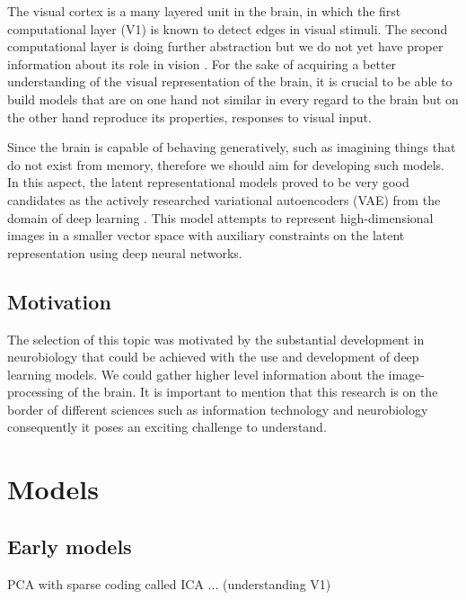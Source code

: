 \documentclass[11pt, english]{article}
\begin{document}
\par  The visual cortex is a many layered unit in the brain, in which the first computational layer (V1) is known to detect edges in visual stimuli.
The second computational layer is doing further abstraction but we do not yet
have proper information about its role in vision \cite{ZiembaV2}. For the sake of acquiring a
better understanding of the visual representation of the brain, it is crucial to be able to build models that are on one hand not similar in every regard to the brain but on the other hand reproduce its properties, responses to visual input.

\vspace{3mm}

\par Since the brain is capable of behaving generatively, such as imagining things that do not exist from memory, therefore we should aim for developing such models. In this aspect, the latent representational models proved to be very good candidates as the actively researched variational autoencoders (VAE) from the domain of deep learning \cite{kingma2013auto}. This model attempts to represent high-dimensional images in a smaller vector space with auxiliary constraints on the latent representation using deep neural networks.

\subsection{Motivation}

\par The selection of this topic was motivated by the substantial development in neurobiology that could be achieved with the use and development of deep learning models. We could gather higher level information about the image-processing of the brain. It is important to mention that this research is on the border of different sciences such as information technology and neurobiology consequently it poses an exciting challenge to understand.

\section{Models}

\subsection{Early models}

\par PCA with sparse coding called ICA \cite{olshausen1996emergence} ... (understanding V1)
\end{document}
